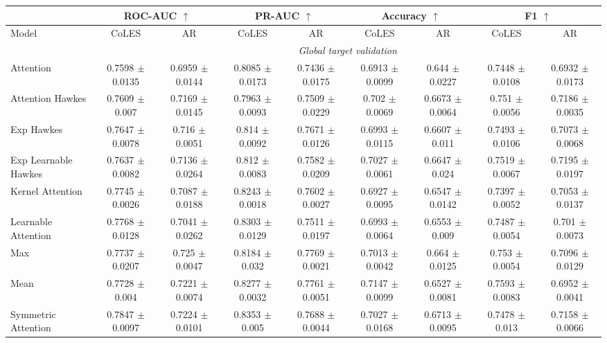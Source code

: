 \begin{table*}[ht]
\centering
\begin{tabular}{|l|c|c|c|c|c|c|c|c|}
\hline
 & \multicolumn{2}{c|}{ROC-AUC $\uparrow$} & \multicolumn{2}{c|}{PR-AUC $\uparrow$} & \multicolumn{2}{c|}{Accuracy $\uparrow$} & \multicolumn{2}{c|}{F1 $\uparrow$} \\
\hline
Model & CoLES & AR & CoLES & AR & CoLES & AR & CoLES & AR \\
\hline
 & \multicolumn{8}{c|}{\textit{Global target validation}}\\
\hline
Attention & 0.7598 $\pm$ 0.0135 & 0.6959 $\pm$ 0.0144 & 0.8085 $\pm$ 0.0173 & 0.7436 $\pm$ 0.0175 & 0.6913 $\pm$ 0.0099 & 0.644 $\pm$ 0.0227 & 0.7448 $\pm$ 0.0108 & 0.6932 $\pm$ 0.0173 \\
\hdashline
Attention Hawkes & 0.7609 $\pm$ 0.007 & 0.7169 $\pm$ 0.0145 & 0.7963 $\pm$ 0.0093 & 0.7509 $\pm$ 0.0229 & 0.702 $\pm$ 0.0069 & 0.6673 $\pm$ 0.0064 & 0.751 $\pm$ 0.0056 & 0.7186 $\pm$ 0.0035 \\
Exp Hawkes & 0.7647 $\pm$ 0.0078 & 0.716 $\pm$ 0.0051 & 0.814 $\pm$ 0.0092 & 0.7671 $\pm$ 0.0126 & 0.6993 $\pm$ 0.0115 & 0.6607 $\pm$ 0.011 & 0.7493 $\pm$ 0.0106 & 0.7073 $\pm$ 0.0068 \\
Exp Learnable Hawkes & 0.7637 $\pm$ 0.0082 & 0.7136 $\pm$ 0.0264 & 0.812 $\pm$ 0.0083 & 0.7582 $\pm$ 0.0209 & 0.7027 $\pm$ 0.0061 & 0.6647 $\pm$ 0.024 & 0.7519 $\pm$ 0.0067 & 0.7195 $\pm$ 0.0197 \\
Kernel Attention & 0.7745 $\pm$ 0.0026 & 0.7087 $\pm$ 0.0188 & 0.8243 $\pm$ 0.0018 & 0.7602 $\pm$ 0.0027 & 0.6927 $\pm$ 0.0095 & 0.6547 $\pm$ 0.0142 & 0.7397 $\pm$ 0.0052 & 0.7053 $\pm$ 0.0137 \\
Learnable Attention & 0.7768 $\pm$ 0.0128 & 0.7041 $\pm$ 0.0262 & 0.8303 $\pm$ 0.0129 & 0.7511 $\pm$ 0.0197 & 0.6993 $\pm$ 0.0064 & 0.6553 $\pm$ 0.009 & 0.7487 $\pm$ 0.0054 & 0.701 $\pm$ 0.0073 \\
Max & 0.7737 $\pm$ 0.0207 & 0.725 $\pm$ 0.0047 & 0.8184 $\pm$ 0.032 & 0.7769 $\pm$ 0.0021 & 0.7013 $\pm$ 0.0042 & 0.664 $\pm$ 0.0125 & 0.753 $\pm$ 0.0054 & 0.7096 $\pm$ 0.0129 \\
Mean & 0.7728 $\pm$ 0.004 & 0.7221 $\pm$ 0.0074 & 0.8277 $\pm$ 0.0032 & 0.7761 $\pm$ 0.0051 & 0.7147 $\pm$ 0.0099 & 0.6527 $\pm$ 0.0081 & 0.7593 $\pm$ 0.0083 & 0.6952 $\pm$ 0.0041 \\
Symmetric Attention & 0.7847 $\pm$ 0.0097 & 0.7224 $\pm$ 0.0101 & 0.8353 $\pm$ 0.005 & 0.7688 $\pm$ 0.0044 & 0.7027 $\pm$ 0.0168 & 0.6713 $\pm$ 0.0095 & 0.7478 $\pm$ 0.013 & 0.7158 $\pm$ 0.0066 \\

\end{tabular}
\end{table*}
